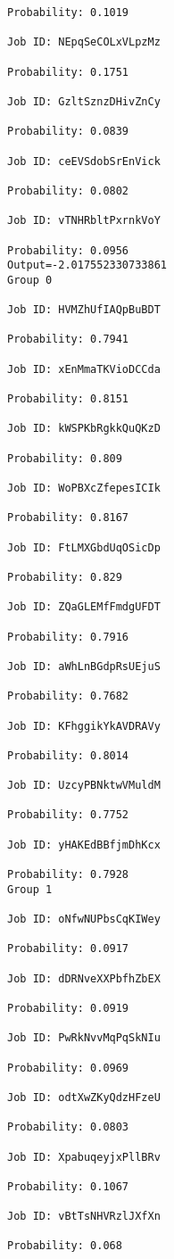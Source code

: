 \documentclass[11pt]{article}
\begin{document}
\begin{Verbatim}[commandchars=\\\{\}]
Probability: 0.1019

Job ID: NEpqSeCOLxVLpzMz

Probability: 0.1751

Job ID: GzltSznzDHivZnCy

Probability: 0.0839

Job ID: ceEVSdobSrEnVick

Probability: 0.0802

Job ID: vTNHRbltPxrnkVoY

Probability: 0.0956
Output=-2.017552330733861
Group 0

Job ID: HVMZhUfIAQpBuBDT

Probability: 0.7941

Job ID: xEnMmaTKVioDCCda

Probability: 0.8151

Job ID: kWSPKbRgkkQuQKzD

Probability: 0.809

Job ID: WoPBXcZfepesICIk

Probability: 0.8167

Job ID: FtLMXGbdUqOSicDp

Probability: 0.829

Job ID: ZQaGLEMfFmdgUFDT

Probability: 0.7916

Job ID: aWhLnBGdpRsUEjuS

Probability: 0.7682

Job ID: KFhggikYkAVDRAVy

Probability: 0.8014

Job ID: UzcyPBNktwVMuldM

Probability: 0.7752

Job ID: yHAKEdBBfjmDhKcx

Probability: 0.7928
Group 1

Job ID: oNfwNUPbsCqKIWey

Probability: 0.0917

Job ID: dDRNveXXPbfhZbEX

Probability: 0.0919

Job ID: PwRkNvvMqPqSkNIu

Probability: 0.0969

Job ID: odtXwZKyQdzHFzeU

Probability: 0.0803

Job ID: XpabuqeyjxPllBRv

Probability: 0.1067

Job ID: vBtTsNHVRzlJXfXn

Probability: 0.068


\end{Verbatim}
\end{document}
